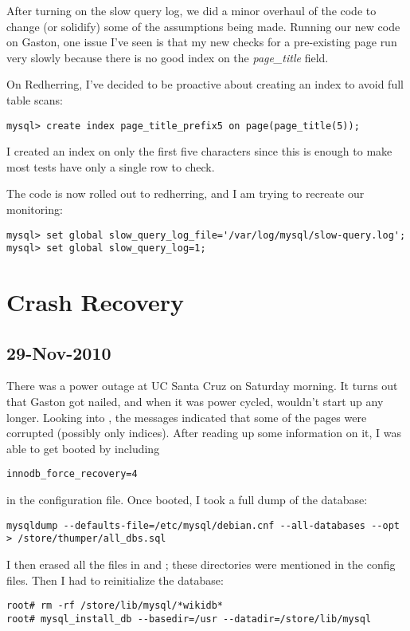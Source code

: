 After turning on the slow query log, we did a minor overhaul of
the code to change (or solidify) some of the assumptions being made.
Running our new code on Gaston, one issue I've seen is that my new
checks for a pre-existing page run very slowly because there is no good index
on the \textit{page\_title} field.

On Redherring, I've decided to be proactive about creating an index to
avoid full table scans:
\begin{verbatim}
mysql> create index page_title_prefix5 on page(page_title(5));
\end{verbatim}
I created an index on only the first five characters since this is enough
to make most tests have only a single row to check.

The code is now rolled out to redherring, and I am trying to recreate our
monitoring:
\begin{verbatim}
mysql> set global slow_query_log_file='/var/log/mysql/slow-query.log';
mysql> set global slow_query_log=1;
\end{verbatim}

\section{Crash Recovery}

\subsection{29-Nov-2010}

There was a power outage at UC Santa Cruz on Saturday morning.
It turns out that Gaston got nailed, and when it was power cycled,
\mysql wouldn't start up any longer.
Looking into , the messages indicated that some
of the pages were corrupted (possibly only indices).
After reading up some information on it, I was able to get
\mysql booted by including
\begin{verbatim}
innodb_force_recovery=4
\end{verbatim}
in the configuration file.
Once booted, I took a full dump of the database:
\begin{verbatim}
mysqldump --defaults-file=/etc/mysql/debian.cnf --all-databases --opt > /store/thumper/all_dbs.sql
\end{verbatim}

I then erased all the \mysql files in  and
; these directories were mentioned in
the config files.
Then I had to reinitialize the database:
\begin{verbatim}
root# rm -rf /store/lib/mysql/*wikidb*
root# mysql_install_db --basedir=/usr --datadir=/store/lib/mysql
\end{verbatim}

